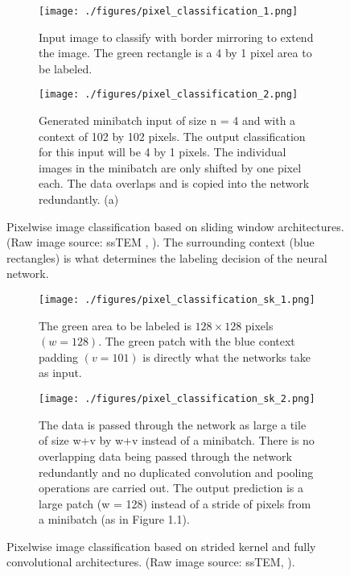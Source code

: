 \begin{figure}[th!]
\begin{subfigure}{0.45\textwidth}
         \centering
         \texttt{[image: ./figures/pixel\_classification\_1.png]}
        \caption{Input image to classify with border mirroring to extend the image. The green rectangle is a 4 by 1 pixel area to be labeled.}
\end{subfigure}
\begin{subfigure}{0.45\textwidth}
         \centering   
        \texttt{[image: ./figures/pixel\_classification\_2.png]}
        \caption{Generated minibatch input of size n = 4 and with a context of 102 by 102 pixels. The output classification for this input will be 4 by 1 pixels. The individual images in the minibatch are only shifted by one pixel each. The data overlaps and is copied into the network redundantly.
(a)}
     \end{subfigure} 
  
    \caption{Pixelwise image classification based on sliding window architectures. (Raw image source: ssTEM \cite{gerhard2013segmented}, \cite{Tschopp:caffe-neural-model}). The surrounding context (blue rectangles) is what determines the labeling decision of the neural network.}
    \label{fig:pixel_classification}
 \end{figure}  

\begin{figure}[th!]
 \begin{subfigure}{0.45\textwidth}
         \centering   
        \texttt{[image: ./figures/pixel\_classification\_sk\_1.png]}
        \caption{The green area to be labeled is $128 \times 128$ pixels $(w = 128)$. The green patch with the blue context padding $(v = 101)$ is directly what the networks take as input.}
            \end{subfigure}
             \begin{subfigure}{0.45\textwidth}
         \centering   
        \texttt{[image: ./figures/pixel\_classification\_sk\_2.png]}
        \caption{The data is passed through the network as large a tile of size w+v by w+v instead of a minibatch. There is no overlapping data being passed through the network
redundantly and no duplicated convolution and pooling operations are carried out. The output prediction is a large patch (w = 128) instead of a stride of pixels from a minibatch (as in Figure 1.1).}
            \end{subfigure}
            \caption{Pixelwise image classification based on strided kernel and fully convolutional architectures. (Raw image source: ssTEM\cite{gerhard2013segmented}, \cite{Tschopp:caffe-neural-model}).}
            \label{fig:pixel_classification_sk_net}
    \end{figure}




